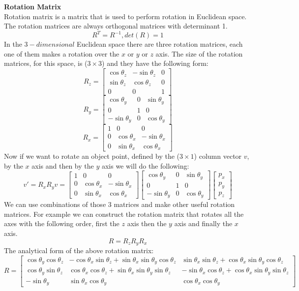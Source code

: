 \textbf{Rotation Matrix}\\
Rotation matrix is a matrix that is used to perform rotation in Euclidean space. The rotation matrices are always orthogonal matrices with determinant 1.
\[R^T = R^{-1},det(R) = 1\]
In the \(3-dimensional\) Euclidean space there are three rotation matrices, each one of them makes a rotation over the \(x\)  or \(y\)  or \(z\) axis. The size of the rotation matrices, for this space, is (\(3\times3\)) and they have the following form:
\[
R_z = 
\begin{bmatrix}
\cos\theta_z & -\sin\theta_z & 0 \\
\sin\theta_z & \cos\theta_z & 0 \\
0 & 0 & 1 
\end{bmatrix}
\]
\[
R_y = 
\begin{bmatrix}
\cos\theta_y & 0 & \sin\theta_y \\
0 & 1 & 0\\
-\sin\theta_y & 0 & \cos\theta_y
\end{bmatrix}
\]
\[
R_x = 
\begin{bmatrix}
1 & 0 & 0 \\
0 & \cos\theta_x & -\sin\theta_x \\
0 & \sin\theta_x & \cos\theta_x
\end{bmatrix}
\]
Now if we want to rotate an object point, defined by the (\(3\times1\)) column vector \(v\), by the \(x\) axis and then by the \(y\) axis we will do the following:
\[
v' = R_xR_yv = 
\begin{bmatrix}
1 & 0 & 0 \\
0 & \cos\theta_x & -\sin\theta_x \\
0 & \sin\theta_x & \cos\theta_x
\end{bmatrix}
\begin{bmatrix}
\cos\theta_y & 0 & \sin\theta_y \\
0 & 1 & 0\\
-\sin\theta_y & 0 & \cos\theta_y
\end{bmatrix}
\begin{bmatrix}
p_x\\
p_y\\
p_z
\end{bmatrix}
\]
We can use combinations of those 3 matrices and make other useful rotation matrices. For example we can construct the rotation matrix that rotates all the axes with the following order, first the \(z\) axis then the \(y\) axis and finally the \(x\) axis.
\[
	R = R_zR_yR_x
\]
The analytical form of the above rotation matrix:
\[
R = 
\begin{bmatrix}
\cos\theta_y\cos\theta_z & -\cos\theta_x\sin\theta_z + \sin\theta_x\sin\theta_y\cos\theta_z & \sin\theta_x\sin\theta_z + \cos\theta_x\sin\theta_y\cos\theta_z\\

\cos\theta_y\sin\theta_z & \cos\theta_x\cos\theta_z + \sin\theta_x\sin\theta_y\sin\theta_z & -\sin\theta_x\cos\theta_z + \cos\theta_x\sin\theta_y\sin\theta_z\\

-\sin\theta_y & \sin\theta_x\cos\theta_y & \cos\theta_x\cos\theta_y
\end{bmatrix}
\]

